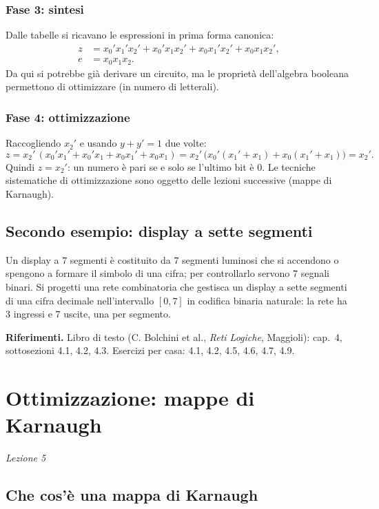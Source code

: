 \documentclass[11pt,a4paper]{article}
\begin{document}
\subsubsection*{Fase 3: sintesi}

Dalle tabelle si ricavano le espressioni in prima forma canonica:
\begin{align*}
z &= x_0'x_1'x_2' + x_0'x_1x_2' + x_0x_1'x_2' + x_0x_1x_2', \\
e &= x_0x_1x_2.
\end{align*}
Da qui si potrebbe già derivare un circuito, ma le proprietà dell'algebra booleana permettono di ottimizzare (in numero di letterali).

\subsubsection*{Fase 4: ottimizzazione}

Raccogliendo $x_2'$ e usando $y + y' = 1$ due volte:
\[
z = x_2'\,(x_0'x_1' + x_0'x_1 + x_0x_1' + x_0x_1) = x_2'\,\bigl(x_0'(x_1'+x_1) + x_0(x_1'+x_1)\bigr) = x_2'.
\]
Quindi $z = x_2'$: un numero è pari se e solo se l'ultimo bit è $0$. Le tecniche sistematiche di ottimizzazione sono oggetto delle lezioni successive (mappe di Karnaugh).

\subsection{Secondo esempio: display a sette segmenti}

Un display a $7$ segmenti è costituito da $7$ segmenti luminosi che si accendono o spengono a formare il simbolo di una cifra; per controllarlo servono $7$ segnali binari. Si progetti una rete combinatoria che gestisca un display a sette segmenti di una cifra decimale nell'intervallo $[0, 7]$ in codifica binaria naturale: la rete ha $3$ ingressi e $7$ uscite, una per segmento.

\medskip
\noindent\textbf{Riferimenti.} Libro di testo (C. Bolchini et al., \emph{Reti Logiche}, Maggioli): cap.\ 4, sottosezioni 4.1, 4.2, 4.3. Esercizi per casa: 4.1, 4.2, 4.5, 4.6, 4.7, 4.9.

\section[Ottimizzazione: mappe di Karnaugh (Lezione 5)]{Ottimizzazione: mappe di Karnaugh}
\noindent\emph{Lezione 5}
\subsection{Che cos'è una mappa di Karnaugh}
\end{document}

